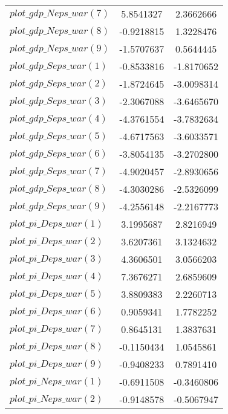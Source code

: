 \begin{center}
\begin{longtable}{lcc}
$plot\_gdp\_N eps\_war (7)  $	 & 	      5.8541327	 & 	      2.3662666 \\ 
$plot\_gdp\_N eps\_war (8)  $	 & 	     -0.9218815	 & 	      1.3228476 \\ 
$plot\_gdp\_N eps\_war (9)  $	 & 	     -1.5707637	 & 	      0.5644445 \\ 
$plot\_gdp\_S eps\_war (1)  $	 & 	     -0.8533816	 & 	     -1.8170652 \\ 
$plot\_gdp\_S eps\_war (2)  $	 & 	     -1.8724645	 & 	     -3.0098314 \\ 
$plot\_gdp\_S eps\_war (3)  $	 & 	     -2.3067088	 & 	     -3.6465670 \\ 
$plot\_gdp\_S eps\_war (4)  $	 & 	     -4.3761554	 & 	     -3.7832634 \\ 
$plot\_gdp\_S eps\_war (5)  $	 & 	     -4.6717563	 & 	     -3.6033571 \\ 
$plot\_gdp\_S eps\_war (6)  $	 & 	     -3.8054135	 & 	     -3.2702800 \\ 
$plot\_gdp\_S eps\_war (7)  $	 & 	     -4.9020457	 & 	     -2.8930656 \\ 
$plot\_gdp\_S eps\_war (8)  $	 & 	     -4.3030286	 & 	     -2.5326099 \\ 
$plot\_gdp\_S eps\_war (9)  $	 & 	     -4.2556148	 & 	     -2.2167773 \\ 
$plot\_pi\_D eps\_war (1)   $	 & 	      3.1995687	 & 	      2.8216949 \\ 
$plot\_pi\_D eps\_war (2)   $	 & 	      3.6207361	 & 	      3.1324632 \\ 
$plot\_pi\_D eps\_war (3)   $	 & 	      4.3606501	 & 	      3.0566203 \\ 
$plot\_pi\_D eps\_war (4)   $	 & 	      7.3676271	 & 	      2.6859609 \\ 
$plot\_pi\_D eps\_war (5)   $	 & 	      3.8809383	 & 	      2.2260713 \\ 
$plot\_pi\_D eps\_war (6)   $	 & 	      0.9059341	 & 	      1.7782252 \\ 
$plot\_pi\_D eps\_war (7)   $	 & 	      0.8645131	 & 	      1.3837631 \\ 
$plot\_pi\_D eps\_war (8)   $	 & 	     -0.1150434	 & 	      1.0545861 \\ 
$plot\_pi\_D eps\_war (9)   $	 & 	     -0.9408233	 & 	      0.7891410 \\ 
$plot\_pi\_N eps\_war (1)   $	 & 	     -0.6911508	 & 	     -0.3460806 \\ 
$plot\_pi\_N eps\_war (2)   $	 & 	     -0.9148578	 & 	     -0.5067947 \\ 

\end{longtable}
\end{center}

